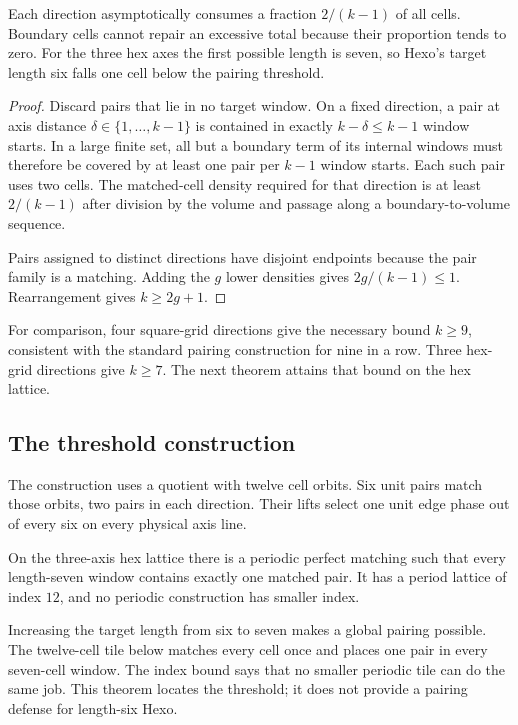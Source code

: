 \begin{plainterms}
Each direction asymptotically consumes a fraction $2/(k-1)$ of all cells.
Boundary cells cannot repair an excessive total because their proportion
tends to zero.  For the three hex axes the first possible length is seven, so
Hexo's target length six falls one cell below the pairing threshold.
\end{plainterms}

\begin{proof}
Discard pairs that lie in no target window.  On a fixed direction, a pair at
axis distance $\delta\in\{1,\ldots,k-1\}$ is contained in exactly
$k-\delta\leq k-1$ window starts.  In a large finite set, all but a boundary
term of its internal windows must therefore be covered by at least one pair
per $k-1$ window starts.  Each such pair uses two cells.  The matched-cell
density required for that direction is at least $2/(k-1)$ after division by
the volume and passage along a boundary-to-volume sequence.

Pairs assigned to distinct directions have disjoint endpoints because the
pair family is a matching.  Adding the $g$ lower densities gives
$2g/(k-1)\leq1$.  Rearrangement gives $k\geq2g+1$.
\end{proof}

For comparison, four square-grid directions give the necessary bound
$k\geq9$, consistent with the standard pairing construction for nine in a
row.  Three hex-grid directions give $k\geq7$.  The next theorem attains that
bound on the hex lattice.

\subsection{The threshold construction}

The construction uses a quotient with twelve cell orbits.  Six unit pairs
match those orbits, two pairs in each direction.  Their lifts select one unit
edge phase out of every six on every physical axis line.

\begin{theorem}[Threshold pairing at $k=7$]
\label{thm:T8.2}
On the three-axis hex lattice there is a periodic perfect matching such that
every length-seven window contains exactly one matched pair.  It has a period
lattice of index $12$, and no periodic construction has smaller index.
\end{theorem}

\begin{plainterms}
Increasing the target length from six to seven makes a global pairing
possible.  The twelve-cell tile below matches every cell once and places one
pair in every seven-cell window.  The index bound says that no smaller
periodic tile can do the same job.  This theorem locates the threshold; it does
not provide a pairing defense for length-six Hexo.
\end{plainterms}

